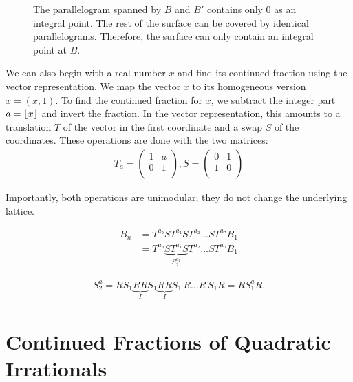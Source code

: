 \begin{figure}[tb]
  \centering
  
  \caption{
    The parallelogram spanned by $B$ and $B'$ contains only $0$ as an integral point.
    The rest of the surface can be covered by identical parallelograms.
    Therefore, the surface can only contain an integral point at $B$.
  }
\end{figure}

We can also begin with a real number $x$ and find its continued fraction using
the vector representation.
We map the vector $x$ to its homogeneous version $\hat x = (x, 1)$.
To find the continued fraction for $x$,
we subtract the integer part $a = \lfloor x\rfloor$ and invert the fraction.
In the vector representation, this amounts to a translation $T$ of the vector in
the first coordinate and a swap $S$ of the coordinates.
These operations are done with the two matrices:
\begin{align*}
  T_a = \begin{pmatrix}
    1 & a \\
    0 & 1 \\
  \end{pmatrix},
  S = \begin{pmatrix}
    0 & 1 \\
    1 & 0 \\
  \end{pmatrix}
\end{align*}

Importantly, both operations are unimodular; they do not change the underlying lattice.

\begin{align*}
  B_n & = T^{a₀} S T^{a₁} S T^{a₂} … S T^{aₙ} B_1 \\
  & = T^{a₀} \underbrace{S T^{a₁} S}_{S_2^{a_1}} T^{a₂} … S T^{aₙ} B_1
\end{align*}

\begin{align*}
  S_2^a = R S_1 \underbrace{R R}_{I} S_1 \underbrace{R R}_I S_1\, R … R\, S_1 R = R S_1^{a} R.
\end{align*}

\section{Continued Fractions of Quadratic Irrationals}

